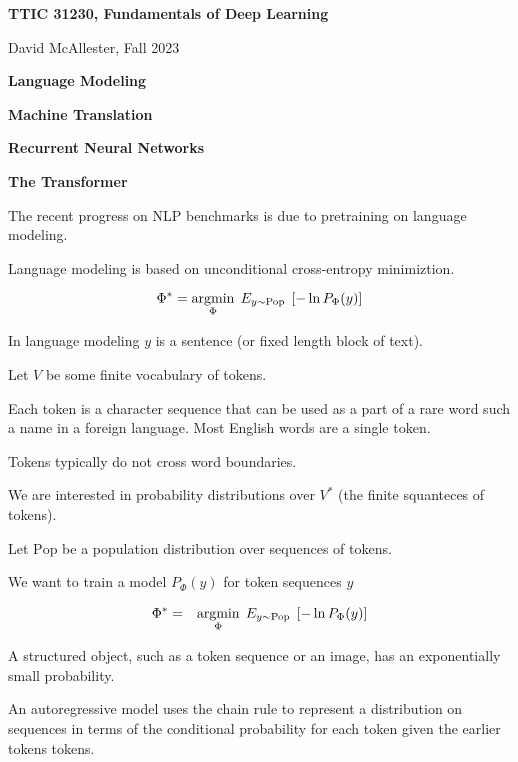 




{\Huge

  \centerline{\bf TTIC 31230, Fundamentals of Deep Learning}
  \bigskip
  \centerline{David McAllester, Fall 2023}
  \vfill
  \vfill
  \centerline{\bf Language Modeling}
  \vfill
  \centerline{\bf Machine Translation}
  \vfill
  \centerline{\bf Recurrent Neural Networks}
  \vfill
  \centerline{\bf The Transformer}
  \vfill
  \vfill


The recent progress on NLP benchmarks is due to pretraining on language modeling.

\vfill
Language modeling is based on unconditional cross-entropy minimiztion.

\vfill
$$\Phi^* = \operatorname*{argmin}_\Phi \;E_{y \sim \mathrm{Pop}}\;\left[-\ln P_\Phi(y)\right]$$

\vfill
In language modeling $y$ is a sentence (or fixed length block of text).


Let $V$ be some finite vocabulary of tokens.

\vfill
Each token is a character sequence that
can be used as a part of a rare word such a name in a foreign language.  Most English words
are a single token.

\vfill
Tokens typically do not cross word boundaries.

\vfill
We are interested in probability distributions over $V^*$ (the finite squanteces of tokens).


Let $\mathrm{Pop}$ be a population distribution over sequences of tokens.

\vfill
We want to train a model $P_\Phi(y)$ for token sequences $y$

\begin{eqnarray*}
\Phi^* & = & \operatorname*{argmin}_\Phi \; E_{y \sim \mathrm{Pop}}\;\left[-\ln P_\Phi(y)\right]
\end{eqnarray*}

A structured object, such as a token sequence or an image, has an exponentially small probability.


An autoregressive model uses the chain rule to represent a distribution on sequences in terms of the conditional probability for each token given  the earlier tokens
tokens.

}
